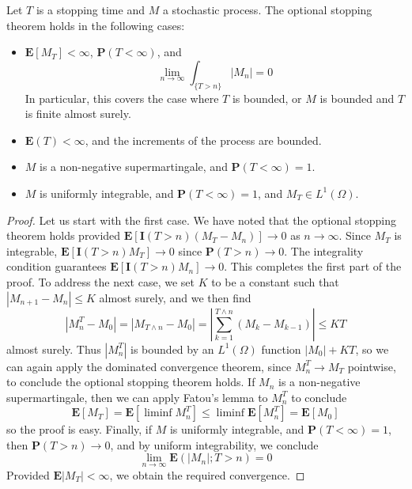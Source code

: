 \begin{theorem}
    Let $T$ is a stopping time and $M$ a stochastic process. The optional stopping theorem holds in the following cases:
    \begin{itemize}
        \item $\mathbf{E}[M_T] < \infty$, $\mathbf{P}(T < \infty)$, and
        \[ \lim_{n \to \infty} \int_{\{ T > n \}} |M_n| = 0 \]
        In particular, this covers the case where $T$ is bounded, or $M$ is bounded and $T$ is finite almost surely.

        \item $\mathbf{E}(T) < \infty$, and the increments of the process are bounded.

        \item $M$ is a non-negative supermartingale, and $\mathbf{P}(T < \infty) = 1$.

        \item $M$ is uniformly integrable, and $\mathbf{P}(T < \infty) = 1$, and $M_T \in L^1(\Omega)$.
    \end{itemize}
\end{theorem}
\begin{proof}
    Let us start with the first case. We have noted that the optional stopping theorem holds provided $\mathbf{E}[\mathbf{I}(T > n)(M_T - M_n)] \to 0$ as $n \to \infty$. Since $M_T$ is integrable, $\mathbf{E}[\mathbf{I}(T > n) M_T] \to 0$ since $\mathbf{P}(T > n) \to 0$. The integrality condition guarantees $\mathbf{E}[\mathbf{I}(T > n) M_n] \to 0$. This completes the first part of the proof. To address the next case, we set $K$ to be a constant such that $|M_{n+1} - M_n| \leq K$ almost surely, and we then find
    \[ |M^T_n - M_0| = |M_{T \wedge n} - M_0| = \left| \sum_{k = 1}^{T \wedge n} (M_k - M_{k-1}) \right| \leq KT \]
    almost surely. Thus $|M^T_n|$ is bounded by an $L^1(\Omega)$ function $|M_0| + KT$, so we can again apply the dominated convergence theorem, since $M^T_n \to M_T$ pointwise, to conclude the optional stopping theorem holds. If $M_n$ is a non-negative supermartingale, then we can apply Fatou's lemma to $M_n^T$ to conclude
    \[ \mathbf{E}[M_T] = \mathbf{E}[\liminf M_n^T] \leq \liminf \mathbf{E}[M_n^T] = \mathbf{E}[M_0] \]
    so the proof is easy. Finally, if $M$ is uniformly integrable, and $\mathbf{P}(T < \infty) = 1$, then $\mathbf{P}(T > n) \to 0$, and by uniform integrability, we conclude
    \[ \lim_{n \to \infty} \mathbf{E}(|M_n|; T > n) = 0 \]
    Provided $\mathbf{E}|M_T| < \infty$, we obtain the required convergence.
\end{proof}

